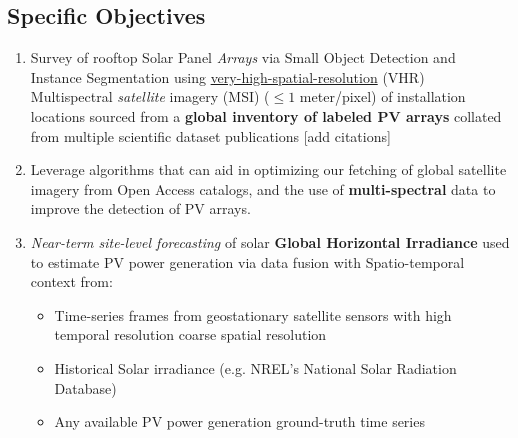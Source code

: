 \subsection{Specific Objectives}
    \begin{enumerate}
        \item Survey of rooftop Solar Panel \textit{Arrays} via Small Object Detection and Instance Segmentation using \href{https://www.maxar.com/maxar-intelligence/constellation}{very-high-spatial-resolution} (VHR) Multispectral \textit{satellite} imagery (MSI) ($\leq1$ meter/pixel) of installation locations sourced from a \textbf{global inventory of labeled PV arrays} collated from multiple scientific dataset publications [add citations] 
        \item Leverage algorithms that can aid in optimizing our fetching of global satellite imagery from Open Access catalogs, and the use of \textbf{multi-spectral} data to improve the detection of PV arrays.
        \item \textit{Near-term site-level forecasting} of solar \textbf{Global Horizontal  Irradiance} used to estimate PV power generation via data fusion with Spatio-temporal context from:
        \begin{itemize}
            \item Time-series frames from geostationary satellite sensors with high temporal resolution coarse spatial resolution
            \item Historical Solar irradiance (e.g. NREL's National Solar Radiation Database)
            \item Any available PV power generation ground-truth time series
        \end{itemize}
        
    \end{enumerate}
    
